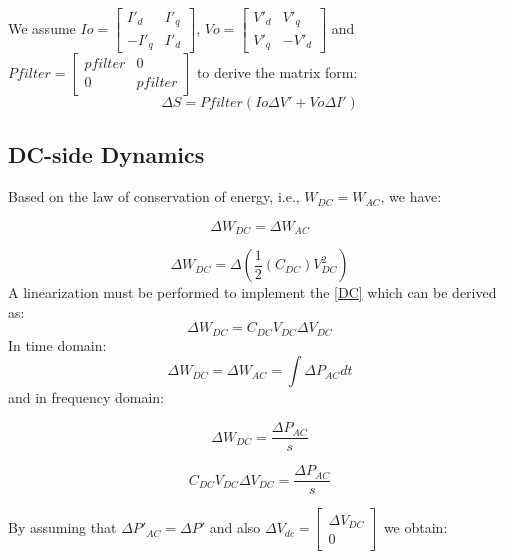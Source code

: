 We assume $Io=\begin{bmatrix}I'_d & I'_q\\-I'_q & I'_d\end{bmatrix}$,  $Vo=\begin{bmatrix}V'_d & V'_q\\V'_q & -V'_d\end{bmatrix}$ and $Pfilter=\begin{bmatrix}pfilter & 0\\0 &  pfilter\end{bmatrix}$ to derive the matrix form:
\begin{equation}\label{p3}
\Delta S =Pfilter(Io \Delta V'+Vo \Delta I')
\end{equation}
\subsection{DC-side Dynamics}

Based on the law of conservation of energy, i.e., $W_{DC}=W_{AC}$, we have:

\begin{equation}
 \Delta W_{DC}=\Delta W_{AC}
\end{equation}

\begin{equation}\label{DC}
 \Delta W_{DC}=\Delta ({\frac{1}{2}(C_{DC})V^2_{DC}})
\end{equation}
A linearization must be performed to implement the \ref{DC} which can be derived as:
\begin{equation}
 \Delta W_{DC}= {C_{DC}V_{DC}\Delta V_{DC}}
\end{equation}
In time domain:
\begin{equation}
 \Delta W_{DC}= \Delta W_{AC}= \int{\Delta P_{AC}}dt
\end{equation}
and in frequency domain:

\begin{equation}
 \Delta W_{DC} = \frac{\Delta P_{AC}}{s}
\end{equation}

\begin{equation}
 {C_{DC}V_{DC}\Delta V_{DC}} = \frac{\Delta P_{AC}}{s}
\end{equation}

By assuming that $\Delta P'_{AC}=\Delta P'$ and also $\Delta V_{dc}=\begin{bmatrix}\Delta V_{DC} \\ 0 \end{bmatrix}$ we obtain:

